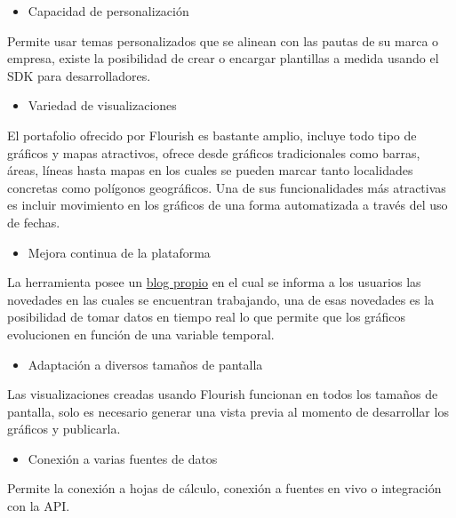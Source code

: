 \documentclass[
]{book}
\providecommand{\tightlist}{%
  \setlength{\itemsep}{0pt}\setlength{\parskip}{0pt}}
\begin{document}
\begin{itemize}
\tightlist
\item
  Capacidad de personalización
\end{itemize}

Permite usar temas personalizados que se alinean con las pautas de su marca o empresa, existe la posibilidad de crear o encargar plantillas a medida usando el SDK para desarrolladores.

\begin{itemize}
\tightlist
\item
  Variedad de visualizaciones
\end{itemize}

El portafolio ofrecido por Flourish es bastante amplio, incluye todo tipo de gráficos y mapas atractivos, ofrece desde gráficos tradicionales como barras, áreas, líneas hasta mapas en los cuales se pueden marcar tanto localidades concretas como polígonos geográficos. Una de sus funcionalidades más atractivas es incluir movimiento en los gráficos de una forma automatizada a través del uso de fechas.

\begin{itemize}
\tightlist
\item
  Mejora continua de la plataforma
\end{itemize}

La herramienta posee un \href{https://flourish.studio/blog/}{blog propio} en el cual se informa a los usuarios las novedades en las cuales se encuentran trabajando, una de esas novedades es la posibilidad de tomar datos en tiempo real lo que permite que los gráficos evolucionen en función de una variable temporal.

\begin{itemize}
\tightlist
\item
  Adaptación a diversos tamaños de pantalla
\end{itemize}

Las visualizaciones creadas usando Flourish funcionan en todos los tamaños de pantalla, solo es necesario generar una vista previa al momento de desarrollar los gráficos y publicarla.

\begin{itemize}
\tightlist
\item
  Conexión a varias fuentes de datos
\end{itemize}

Permite la conexión a hojas de cálculo, conexión a fuentes en vivo o integración con la API.
\end{document}
